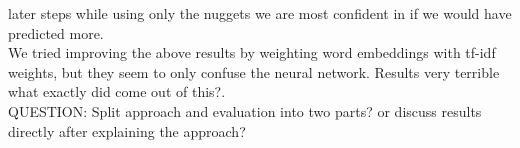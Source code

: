 later steps while using only the nuggets we are most confident in if we would have predicted more.\\
We tried improving the above results by weighting word embeddings with tf-idf weights, but they seem to only confuse the neural network. Results very terrible \lbrack what exactly did come out of this?\rbrack .\\
QUESTION: Split approach and evaluation into two parts? or discuss results directly after explaining the approach?
